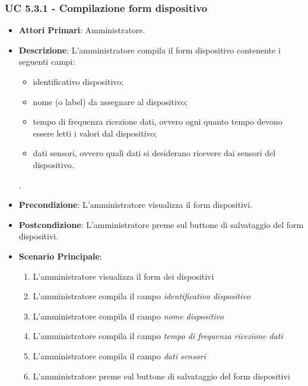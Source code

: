 			\subsubsection{UC 5.3.1 - Compilazione form dispositivo}
			\begin{itemize}
				\item \textbf{Attori Primari}: Amministratore.
				\item \textbf{Descrizione}: L'amministratore compila il form dispositivo contenente i seguenti campi:
				\begin{itemize}
					\item identificativo dispositivo; 
					\item nome (o label) da assegnare al dispositivo;
					\item tempo di frequenza ricezione dati, ovvero ogni quanto tempo devono essere letti i valori dal dispositivo;
					\item dati sensori, ovvero quali dati si desiderano ricevere dai sensori del dispositivo.
				\end{itemize}.
				\item \textbf{Precondizione}: L'amministratore visualizza il form dispositivi.
				\item \textbf{Postcondizione}: L'amministratore preme sul buttone di salvataggio del form dispositivi.
				\item \textbf{Scenario Principale}:
				\begin{enumerate}
					\item{L'amministratore visualizza il form dei dispositivi}
					\item{L'amministratore compila il campo \textit{identificativo dispositivo}}
					\item{L'amministratore compila il campo \textit{nome dispositivo}}
					\item{L'amministratore compila il campo \textit{tempo di frequenza ricezione dati}}
					\item{L'amministratore compila il campo \textit{dati sensori}}
					\item{L'amministratore preme sul buttone di salvataggio del form dispositivi}
				\end{enumerate}
			\end{itemize}
			
